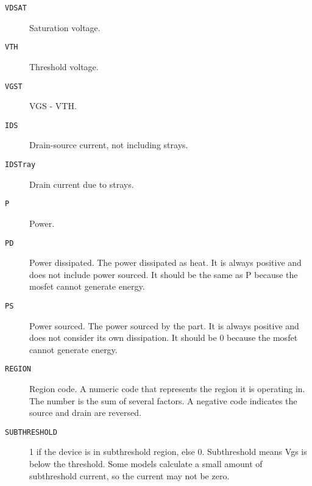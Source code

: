 \begin{description}
\item[{\tt VDSAT}] Saturation voltage.

\item[{\tt VTH}] Threshold voltage.

\item[{\tt VGST}] VGS - VTH.

\item[{\tt IDS}] Drain-source current, not including strays.

\item[{\tt IDSTray}] Drain current due to strays.

\item[{\tt P}] Power.

\item[{\tt PD}]
Power dissipated.  The power dissipated as heat.  It is always
positive and does not include power sourced.  It should be the same as
P because the mosfet cannot generate energy.

\item[{\tt PS}]
Power sourced.  The power sourced by the part.  It is always positive
and does not consider its own dissipation.  It should be 0 because the
mosfet cannot generate energy.

\item[{\tt REGION}]
Region code.  A numeric code that represents the region it is
operating in.  The number is the sum of several factors.  A negative
code indicates the source and drain are reversed.


\item[{\tt SUBTHRESHOLD}]
1 if the device is in subthreshold region, else 0.  Subthreshold means
Vgs is below the threshold.  Some models calculate a small amount of
subthreshold current, so the current may not be zero.


\end{description}
